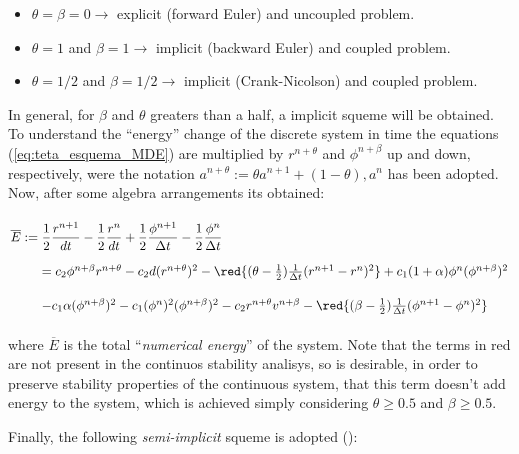 \begin{itemize}
\item $\theta = \beta = 0 \rightarrow$  explicit (forward Euler) and uncoupled problem.
\item $\theta = 1$ and $\beta = 1 \rightarrow$ implicit (backward Euler) and coupled problem.
\item $\theta = 1/2$ and $\beta = 1/2 \rightarrow$ implicit (Crank-Nicolson) and coupled problem.  
\end{itemize}

In general, for $\beta$ and $\theta$ greaters than a half, a implicit squeme will be obtained. To understand the ``energy'' change of the discrete system in time the equations (\ref{eq:teta_esquema_MDE}) are multiplied by $r^{n + \theta}$ and $\phi^{n + \beta}$ up and down, respectively, were the notation $a^{n + \theta} := \theta a^{n+1} + (1 - \theta), a^n$ has been adopted. Now, after some algebra arrangements its obtained:

\begin{equation}
\arraycolsep=1.4pt\def\arraystretch{2.2}
\begin{array}{llr}
\overline{E}:= & \dfrac{1}{2} \dfrac{r^{n+1}}{dt} - \dfrac{1}{2} \dfrac{r^{n}}{dt} + \dfrac{1}{2} \dfrac{\phi^{n+1}}{\Delta t} - \dfrac{1}{2} \dfrac{\phi^{n}}{\Delta t} \\

& = c_2 \phi^{n + \beta} r^{n + \theta} 
- c_2 d (r^{n + \theta})^2 
- \red{(\theta - \frac{1}{2}) \frac{1}{\Delta t} (r^{n+1} - r^n)^2} 
+ c_1 (1 + \alpha) \phi^n (\phi^{n + \beta})^2 \\
& - c_1 \alpha (\phi^{n + \beta})^{2}
- c_1 (\phi^n)^2 (\phi^{n + \beta})^2
- c_2 r^{n + \theta} v^{n + \beta}
- \red{(\beta - \frac{1}{2}) \frac{1}{\Delta t} (\phi^{n+1} - \phi^n)^2 }
\end{array}
\end{equation}

\noindent where $\overline{E}$ is the total ``\textsl{numerical energy}'' of the system. Note that the terms in red are not present in the continuos stability analisys, so is desirable, in order to preserve stability properties of the continuous system, that this term doesn't add energy to the system, which is achieved simply considering $\theta \geqslant 0.5$ and $\beta \geqslant 0.5$.

Finally, the following \textsl{semi-implicit} squeme is adopted ():


